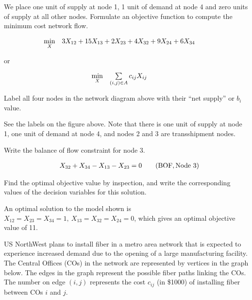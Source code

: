 \begin{parts}
We  place one unit of supply at node 1, 1 unit of demand at node 4 and zero units of supply at all other nodes. Formulate an objective function to compute the minimum cost network flow. 

 \[
    \begin{array}{llll}
      \displaystyle\min_{ \tiny{\it X}} &  3 X_{12} + 15 X_{13} + 2 X_{23} + 4 X_{32} + 9 X_{24} + 6 X_{34} & &  \\
    \end{array}
    \]

or

 \[
    \begin{array}{llll}
      \displaystyle\min_{ \tiny{\it X}} &  \sum\limits_{(i,j) \in A} c_{ij} X_{ij} & &  \\
    \end{array}
    \]

\vfill

 Label all four nodes in the network diagram above with their ``net supply'' or $b_i$ value.

\vspace{0.5cm}

See the labels on the figure above.  Note that there is one unit of supply at node 1, one unit of demand at node 4, and nodes 2 and 3 are transshipment nodes.

 Write the balance of flow constraint for node 3.

 \[
    \begin{array}{llll}

& X_{32} + X_{34} - X_{13} - X_{23} = 0 & & {\rm (BOF, Node~3)}\\
    \end{array}
    \]

\vfill

 Find the optimal objective value by inspection, and write the corresponding values of the decision variables for this solution.

An optimal solution to the model shown is $X_{12}=X_{23}=X_{34}=1, ~ X_{13}=X_{32}=X_{24} = 0$, which gives an optimal objective value of 11.
\vfill

\end{parts}
\newpage

US NorthWest plans to install fiber in a metro area network that is expected to experience increased demand due to the opening of a large manufacturing facility.  The Central Offices (COs) in the network are represented by vertices in the graph below.  The edges in the graph represent the possible fiber paths linking the COs.  The number on edge $(i,j)$ represents the cost $c_{ij}$ (in \$1000) of installing fiber between COs $i$ and $j$.

